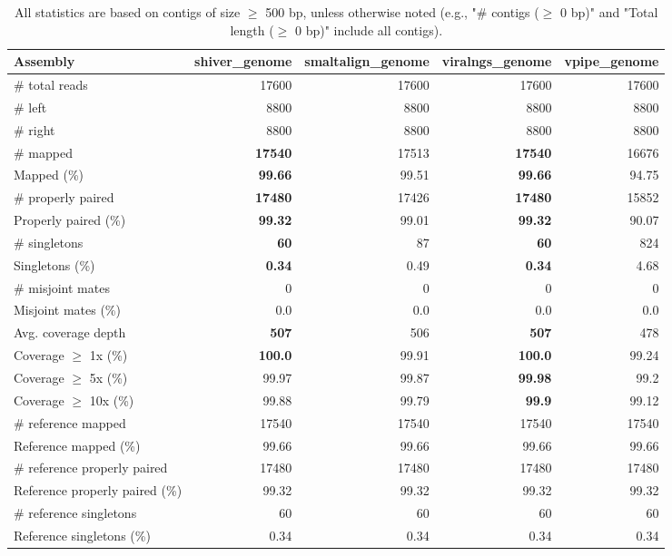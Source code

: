 \documentclass[12pt,a4paper]{article}
\begin{document}
\begin{table}[ht]
\begin{center}
\caption{All statistics are based on contigs of size $\geq$ 500 bp, unless otherwise noted (e.g., "\# contigs ($\geq$ 0 bp)" and "Total length ($\geq$ 0 bp)" include all contigs).}
\begin{tabular}{|l*{4}{|r}|}
\hline
Assembly & shiver\_genome & smaltalign\_genome & viralngs\_genome & vpipe\_genome \\ \hline
\# total reads & 17600 & 17600 & 17600 & 17600 \\ \hline
\# left & 8800 & 8800 & 8800 & 8800 \\ \hline
\# right & 8800 & 8800 & 8800 & 8800 \\ \hline
\# mapped & {\bf 17540} & 17513 & {\bf 17540} & 16676 \\ \hline
Mapped (\%) & {\bf 99.66} & 99.51 & {\bf 99.66} & 94.75 \\ \hline
\# properly paired & {\bf 17480} & 17426 & {\bf 17480} & 15852 \\ \hline
Properly paired (\%) & {\bf 99.32} & 99.01 & {\bf 99.32} & 90.07 \\ \hline
\# singletons & {\bf 60} & 87 & {\bf 60} & 824 \\ \hline
Singletons (\%) & {\bf 0.34} & 0.49 & {\bf 0.34} & 4.68 \\ \hline
\# misjoint mates & 0 & 0 & 0 & 0 \\ \hline
Misjoint mates (\%) & 0.0 & 0.0 & 0.0 & 0.0 \\ \hline
Avg. coverage depth & {\bf 507} & 506 & {\bf 507} & 478 \\ \hline
Coverage $\geq$ 1x (\%) & {\bf 100.0} & 99.91 & {\bf 100.0} & 99.24 \\ \hline
Coverage $\geq$ 5x (\%) & 99.97 & 99.87 & {\bf 99.98} & 99.2 \\ \hline
Coverage $\geq$ 10x (\%) & 99.88 & 99.79 & {\bf 99.9} & 99.12 \\ \hline
\# reference mapped & 17540 & 17540 & 17540 & 17540 \\ \hline
Reference mapped (\%) & 99.66 & 99.66 & 99.66 & 99.66 \\ \hline
\# reference properly paired & 17480 & 17480 & 17480 & 17480 \\ \hline
Reference properly paired (\%) & 99.32 & 99.32 & 99.32 & 99.32 \\ \hline
\# reference singletons & 60 & 60 & 60 & 60 \\ \hline
Reference singletons (\%) & 0.34 & 0.34 & 0.34 & 0.34 \\ \hline

\end{tabular}
\end{center}
\end{table}
\end{document}
